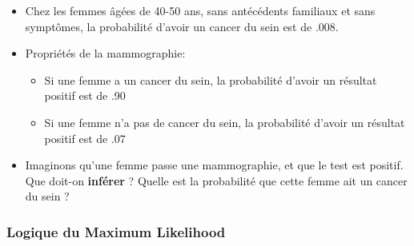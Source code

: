 \documentclass[
  a4paper,11pt,twoside,onecolumn,openright,final,oldfontcommands]{memoir}
\providecommand{\tightlist}{%
  \setlength{\itemsep}{0pt}\setlength{\parskip}{0pt}}
\theoremstyle{definition}
\theoremstyle{definition}
\theoremstyle{definition}
\theoremstyle{remark}
\begin{document}
\begin{itemize}
\item
  Chez les femmes âgées de 40-50 ans, sans antécédents familiaux et sans symptômes, la probabilité d'avoir un cancer du sein est de .008.
\item
  Propriétés de la mammographie:

  \begin{itemize}
  \tightlist
  \item
    Si une femme a un cancer du sein, la probabilité d'avoir un résultat positif est de .90
  \item
    Si une femme n'a pas de cancer du sein, la probabilité d'avoir un résultat positif est de .07
  \end{itemize}
\item
  Imaginons qu'une femme passe une mammographie, et que le test est positif. Que doit-on \textbf{inférer} ? Quelle est la probabilité que cette femme ait un cancer du sein ?
\end{itemize}

\hypertarget{logique-du-maximum-likelihood}{%
\subsubsection{Logique du Maximum Likelihood}\label{logique-du-maximum-likelihood}}
\end{document}
